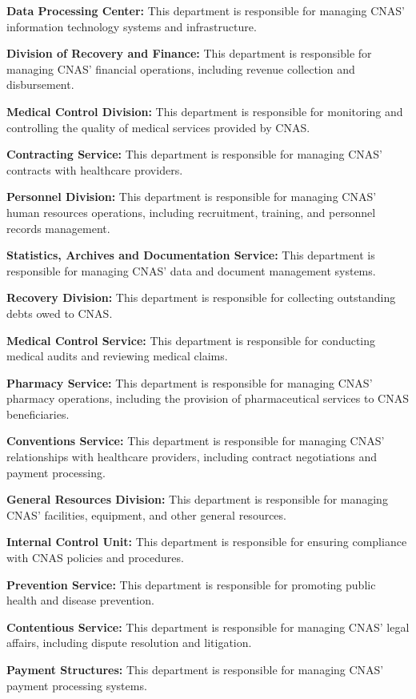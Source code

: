 \textbf{Data Processing Center:} This department is responsible for managing CNAS' information technology systems and infrastructure.

\textbf{Division of Recovery and Finance:} This department is responsible for managing CNAS' financial operations, including revenue collection and disbursement.

\textbf{Medical Control Division:} This department is responsible for monitoring and controlling the quality of medical services provided by CNAS.

\textbf{Contracting Service:} This department is responsible for managing CNAS' contracts with healthcare providers.

\textbf{Personnel Division:} This department is responsible for managing CNAS' human resources operations, including recruitment, training, and personnel records management.

\textbf{Statistics, Archives and Documentation Service:} This department is responsible for managing CNAS' data and document management systems.

\textbf{Recovery Division:} This department is responsible for collecting outstanding debts owed to CNAS.

\textbf{Medical Control Service:} This department is responsible for conducting medical audits and reviewing medical claims.

\textbf{Pharmacy Service:} This department is responsible for managing CNAS' pharmacy operations, including the provision of pharmaceutical services to CNAS beneficiaries.

\textbf{Conventions Service:} This department is responsible for managing CNAS' relationships with healthcare providers, including contract negotiations and payment processing.

\textbf{General Resources Division:} This department is responsible for managing CNAS' facilities, equipment, and other general resources.

\textbf{Internal Control Unit:} This department is responsible for ensuring compliance with CNAS policies and procedures.

\textbf{Prevention Service:} This department is responsible for promoting public health and disease prevention.

\textbf{Contentious Service:} This department is responsible for managing CNAS' legal affairs, including dispute resolution and litigation.

\textbf{Payment Structures:} This department is responsible for managing CNAS' payment processing systems.


